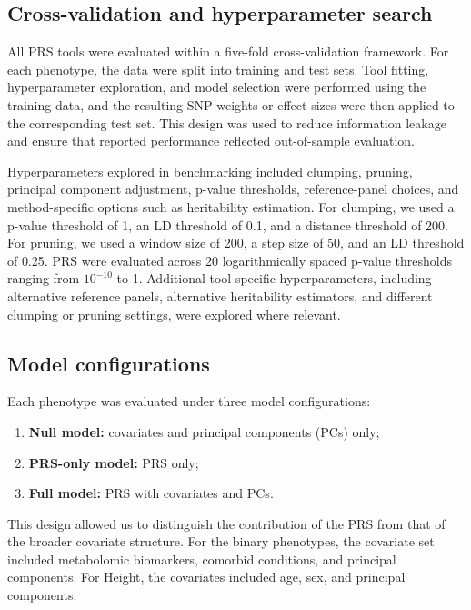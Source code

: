 \documentclass[pdflatex,sn-basic]{sn-jnl}
\begin{document}
\subsection*{Cross-validation and hyperparameter search}

All PRS tools were evaluated within a five-fold cross-validation framework. For each phenotype, the data were split into training and test sets. Tool fitting, hyperparameter exploration, and model selection were performed using the training data, and the resulting SNP weights or effect sizes were then applied to the corresponding test set. This design was used to reduce information leakage and ensure that reported performance reflected out-of-sample evaluation.

Hyperparameters explored in benchmarking included clumping, pruning, principal component adjustment, p-value thresholds, reference-panel choices, and method-specific options such as heritability estimation. For clumping, we used a p-value threshold of 1, an LD threshold of 0.1, and a distance threshold of 200. For pruning, we used a window size of 200, a step size of 50, and an LD threshold of 0.25. PRS were evaluated across 20 logarithmically spaced p-value thresholds ranging from $10^{-10}$ to 1. Additional tool-specific hyperparameters, including alternative reference panels, alternative heritability estimators, and different clumping or pruning settings, were explored where relevant.

\subsection*{Model configurations}

Each phenotype was evaluated under three model configurations:

\begin{enumerate}
    \item \textbf{Null model:} covariates and principal components (PCs) only;
    \item \textbf{PRS-only model:} PRS only;
    \item \textbf{Full model:} PRS with covariates and PCs.
\end{enumerate}

This design allowed us to distinguish the contribution of the PRS from that of the broader covariate structure. For the binary phenotypes, the covariate set included metabolomic biomarkers, comorbid conditions, and principal components. For Height, the covariates included age, sex, and principal components.
\end{document}
